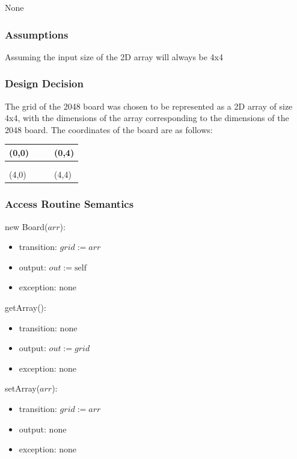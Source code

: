 \documentclass[12pt]{article}
\begin{document}
None

\subsubsection* {Assumptions}

Assuming the input size of the 2D array will always be 4x4

\subsubsection*{Design Decision}

The grid of the 2048 board was chosen to be represented as a 2D array of size 4x4, with the dimensions of the array corresponding to the dimensions of the 2048 board. The coordinates of the board are as follows:
\begin{table}[h]
\centering
\begin{tabular}{|l|l|l|l|}
\hline
(0,0) &  &  & (0,4) \\ \hline
      &  &  &       \\ \hline
      &  &  &       \\ \hline
(4,0) &  &  & (4,4) \\ \hline
\end{tabular}
\end{table}

\subsubsection* {Access Routine Semantics}

\noindent new Board($\mathit{arr}$):
\begin{itemize}
\item transition: $\mathit{grid} := \mathit{arr}$
\item output: $out := \mbox{self}$
\item exception: none
\end{itemize}

\noindent getArray():
\begin{itemize}
\item transition: none
\item output: $\mathit{out} := \mathit{grid}$
\item exception: none
\end{itemize}

\noindent setArray($\mathit{arr}$):
\begin{itemize}
\item transition: $\mathit{grid} := \mathit{arr}$
\item output: none
\item exception: none
\end{itemize}
\end{document}
